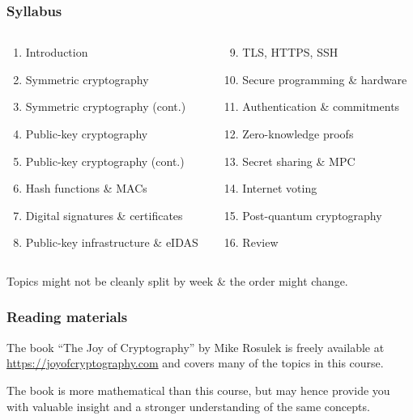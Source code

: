 \begin{frame}
  \frametitle{Syllabus}

  \begin{columns}[t]
    \begin{column}{.5\textwidth}
      \begin{enumerate}
        \item Introduction
        \item Symmetric cryptography
        \item Symmetric cryptography (cont.)
        \item Public-key cryptography
        \item Public-key cryptography (cont.)
        \item Hash functions \& MACs
        \item Digital signatures \& certificates
        \item Public-key infrastructure \& eIDAS
      \end{enumerate}
    \end{column}

    \begin{column}{.5\textwidth}
      \begin{enumerate}\setcounter{enumi}{8}
        \item TLS, HTTPS, SSH
        \item Secure programming \& hardware
        \item Authentication \& commitments
        \item Zero-knowledge proofs
        \item Secret sharing \& MPC
        \item Internet voting
        \item Post-quantum cryptography
        \item Review
      \end{enumerate}
    \end{column}
  \end{columns}

  \vspace*{2em}

  \pause
  Topics might not be cleanly split by week \& the order might change.
\end{frame}

\begin{frame}
  \frametitle{Reading materials}

  The book \enquote{The Joy of Cryptography} by Mike Rosulek is freely available at \url{https://joyofcryptography.com} and covers many of the topics in this course.

  \vspace*{1em}

  The book is more mathematical than this course, but may hence provide you with valuable insight and a stronger understanding of the same concepts. 
\end{frame}


